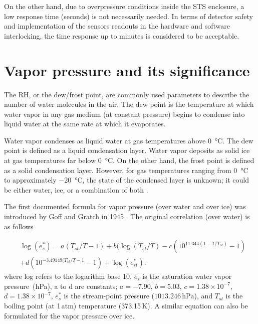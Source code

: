 On the other hand, due to overpressure conditions inside the \gls{STS} enclosure, a low response time (seconds) is not necessarily needed. In terms of detector safety and implementation of the sensors readouts in the hardware and software interlocking, the time response up to minutes is considered to be acceptable. 

\section{Vapor pressure and its significance}

The \gls{RH}, or the dew/frost point, are commonly used parameters to describe the number of water molecules in the air. The dew point is the temperature at which water vapor in any gas medium (at constant pressure) begins to condense into liquid water at the same rate at which it evaporates.

Water vapor condenses as liquid water at gas temperatures above \SI{0}{\celsius}. The dew point is defined as a liquid condensation layer. Water vapor deposits as solid ice at gas temperatures far below \SI{0}{\celsius}. On the other hand, the frost point is defined as a solid condensation layer. However, for gas temperatures ranging from \SI{0}{\celsius} to approximately \SI{-20}{\celsius}, the state of the condensed layer is unknown; it could be either water, ice, or a combination of both \cite{nie_dewpoint}. 


The first documented formula for vapor pressure (over water and over ice) was introduced by Goff and Gratch in 1945 \cite{goff_gratch}. The original correlation (over water) is as follows

\begin{equation}
\label{gratch}
\begin{split}
    &\log({e}^{*}_{s}) = a(T_{st}/T - 1) + b(\log(T_{st}/T) - c(10^{11.344(1-T/T_{st})} - 1) \\
    &+ d(10^{-3.49149(T_{st}/T - 1} -1) + \log(e^{*}_{st}).
\end{split}
\end{equation}
where log refers to the logarithm base 10, $e_{s}$ is the saturation water vapor pressure~(hPa), a to d are constants; $a = - 7.90$, $b=5.03$, $c=1.38\times10^{-7}$, $d=1.38\times10^{-7}$, $e^{*}_{s}$ is the stream-point pressure ($1013.246\,\mathrm{hPa}$), and $T_{st}$ is the boiling point (at 1\,atm) temperature (373.15\,K). A similar equation can also be formulated for the vapor pressure over ice. 

